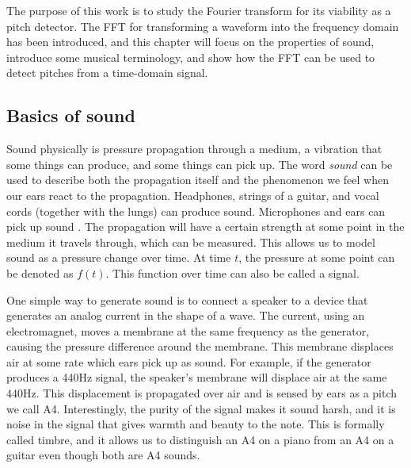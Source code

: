 The purpose of this work is to study the Fourier transform for its viability as a pitch detector. The FFT for transforming a waveform into the frequency domain has been introduced, and this chapter will focus on the properties of sound, introduce some musical terminology, and show how the FFT can be used to detect pitches from a time-domain signal.

\subsection{Basics of sound}
Sound physically is pressure propagation through a medium, a vibration that some things can produce, and some things can pick up. The word \textit{sound} can be used to describe both the propagation itself and the phenomenon we feel when our ears react to the propagation. Headphones, strings of a guitar, and vocal cords (together with the lungs) can produce sound. Microphones and ears can pick up sound \cite{RossingMooreWheeler}. The propagation will have a certain strength at some point in the medium it travels through, which can be measured. This allows us to model sound as a pressure change over time. At time $t$, the pressure at some point can be denoted as $f(t)$. This function over time can also be called a signal.

One simple way to generate sound is to connect a speaker to a device that generates an analog current in the shape of a wave. The current, using an electromagnet, moves a membrane at the same frequency as the generator, causing the pressure difference around the membrane. This membrane displaces air at some rate which ears pick up as sound. For example, if the generator produces a 440Hz signal, the speaker's membrane will displace air at the same 440Hz. This displacement is propagated over air and is sensed by ears as a pitch we call A4. Interestingly, the purity of the signal makes it sound harsh, and it is noise in the signal that gives warmth and beauty to the note. This is formally called timbre, and it allows us to distinguish an A4 on a piano from an A4 on a guitar even though both are A4 sounds.



